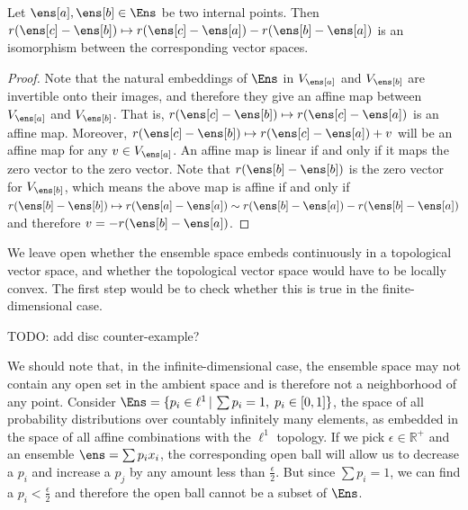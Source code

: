 \begin{mathSection}
	\begin{prop}
		Let $\ens[a],\ens[b] \in \Ens$ be two internal points. Then $r(\ens[c] - \ens[b]) \mapsto r(\ens[c]-\ens[a]) - r(\ens[b]-\ens[a])$ is an isomorphism between the corresponding vector spaces.
	\end{prop}
	
	\begin{proof}
		Note that the natural embeddings of $\Ens$ in $V_{\ens[a]}$ and $V_{\ens[b]}$ are invertible onto their images, and therefore they give an affine map between $V_{\ens[a]}$ and $V_{\ens[b]}$. That is, $r(\ens[c] - \ens[b]) \mapsto r(\ens[c]-\ens[a])$ is an affine map. Moreover, $r(\ens[c] - \ens[b]) \mapsto r(\ens[c]-\ens[a]) + v$ will be an affine map for any $v \in V_{\ens[a]}$. An affine map is linear if and only if it maps the zero vector to the zero vector. Note that $r(\ens[b] - \ens[b])$ is the zero vector for $V_{\ens[b]}$, which means the above map is affine if and only if $r(\ens[b] - \ens[b]) \mapsto r(\ens[a] - \ens[a]) \sim r(\ens[b]-\ens[a]) - r (\ens[b]-\ens[a])$ and therefore $v = -r(\ens[b]-\ens[a])$.
	\end{proof}
\end{mathSection}

We leave open whether the ensemble space embeds continuously in a topological vector space, and whether the topological vector space would have to be locally convex. The first step would be to check whether this is true in the finite-dimensional case.

TODO: add disc counter-example?

\begin{mathSection}
	\begin{remark}
We should note that, in the infinite-dimensional case, the ensemble space may not contain any open set in the ambient space and is therefore not a neighborhood of any point. Consider $\Ens = \{ p_i \in \ell^1 \, | \,  \sum p_ i =1, \; p_i \in [0,1]\}$, the space of all probability distributions over countably infinitely many elements, as embedded in the space of all affine combinations with the $\ell^1$ topology. If we pick $\epsilon \in \mathbb{R}^+$ and an ensemble $\ens = \sum p_i x_i$, the corresponding open ball will allow us to decrease a $p_i$ and increase a $p_j$ by any amount less than $\frac{\epsilon}{2}$. But since $\sum p_i = 1$, we can find a $p_i < \frac{\epsilon}{2}$ and therefore the open ball cannot be a subset of $\Ens$.
	\end{remark}
\end{mathSection}


